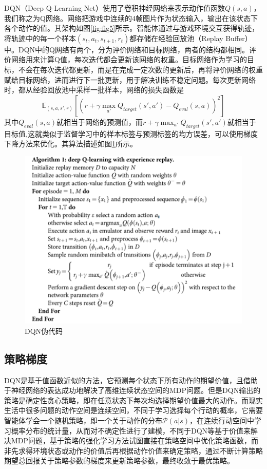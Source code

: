 \documentclass[lang=cn,11pt,a4paper,cite=number]{elegantpaper}
\begin{document}
DQN（Deep Q-Learning Net）使用了卷积神经网络来表示动作值函数$Q(s,a)$，我们称之为Q网络。网络把游戏中连续的4帧图片作为状态输入，输出在该状态下各个动作的值。其架构如图\ref{fig:fig5}所示。智能体通过与游戏环境交互获得轨迹，将轨迹中的每一个样本$(s_t,a_t,s_{t+1},r_t)$都存储在经验回放池（Replay Buffer）中。DQN中的Q网络有两个，分为评价网络和目标网络，两者的结构都相同。评价网络用来计算Q值，每次迭代都会更新该网络的权重。目标网络作为学习的目标，不会在每次迭代都更新，而是在完成一定次数的更新后，再将评价网络的权重赋给目标网络，进而进行下一批更新，用于解决训练不稳定问题。每次更新网络时，都从经验回放池中采样一批样本，网络的损失函数是$$\mathbb{E}_{(s,a,s',r)}[(r+\gamma\max_{a'}Q_{target}(s',a')-Q_{eval}(s,a))^2]$$其中$Q_{eval}(s,a)$就相当于网络的预测值，而$r+\gamma\max_{a'} Q_{target}(s',a')$就相当于目标值,这就类似于监督学习中的样本标签与预测标签的均方误差，可以使用梯度下降方法来优化。其算法描述如图\ref{fig:fig6}所示。
\begin{figure}
	\centering
	\includegraphics[width=0.9\linewidth]{figure/fig6}
	\caption{DQN伪代码\cite{journals/nature/MnihKSRVBGRFOPB15}}
	\label{fig:fig6}
\end{figure}
\subsection{策略梯度}
DQN是基于值函数近似的方法，它预测每个状态下所有动作的期望价值，且借助于神经网络的表达成功地解决了高维连续状态空间的MDP问题。但是DQN输出的策略是确定性贪心策略，即在任意状态下每次均选择期望价值最大的动作。而现实生活中很多问题的动作空间是连续空间，不同于学习选择每个行动的概率，它需要智能体学会一个随机策略，即一个关于动作的分布$\mathcal{P}(a|s)$，在连续行动空间中学习概率分布的统计量，从而对不确定性进行了建模，不同于DQN等基于价值来解决MDP问题，基于策略的强化学习方法试图直接在策略空间中优化策略函数，而非先求得环境状态或动作的价值后再根据动作价值来确定策略，通过不断计算策略期望总回报关于策略参数的梯度来更新策略参数，最终收敛于最优策略。
\end{document}
